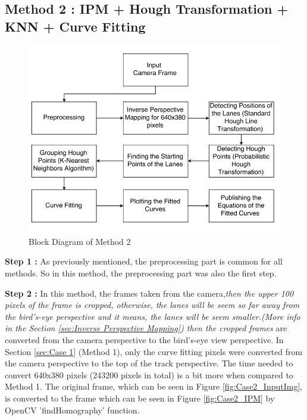 \subsection{Method 2 : IPM + Hough Transformation + KNN + Curve Fitting}\label{sec:Case 2}

\begin{figure}[H]
 \centering
  \includegraphics[width=1\textwidth]{./Bilder/Case2_BlockDiagram.png}
	\caption{Block Diagram of Method 2}
	\label{fig:Case2_BlockDiagram}
\end{figure}

\textbf{Step 1 : }As previously mentioned, the preprocessing part is common for all methods. So in this method, the preprocessing part was also the first step.

\textbf{Step 2 : }In this method, the frames taken from the camera,\emph{\color{green}then the upper 100 pixels of the frame is cropped, otherwise, the lanes will be seem so far away from the bird's-eye perspective and it means, the lanes will be seem smaller.(More info in the Section \ref{sec:Inverse Perspective Mapping}) then the cropped frames} are converted from the camera perspective to the bird's-eye view perspective. In Section \ref{sec:Case 1} (Method 1), only the curve fitting pixels were converted from the camera perspective to the top of the track perspective. The time needed to convert 640x380 pixels (243200 pixels in total) is a bit more when compared to Method 1. The original frame, which can be seen in Figure \ref{fig:Case2_InputImg}, is converted to the frame which can be seen in Figure \ref{fig:Case2_IPM} by OpenCV 'findHomography' function.

